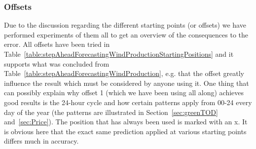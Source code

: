 \subsubsection{Offsets}
Due to the discussion regarding the different starting points (or offsets) we have performed experiments of them all to get an overview of the consequences to the error. All offsets have been tried in Table~\ref{table:stepAheadForecastingWindProductionStartingPositions} and it supports what was concluded from Table~\ref{table:stepAheadForecastingWindProduction}, e.g. that the offset greatly influence the result which must be considered by anyone using it. One thing that can possibly explain why offset 1 (which we have been using all along) achieves good results is the 24-hour cycle and how certain patterns apply from 00-24 every day of the year (the patterns are illustrated in Section~\ref{sec:greenTOD} and~\ref{sec:Price}). The position that has always been used is marked with an x. It is obvious here that the exact same prediction applied at various starting points differs much in accuracy. 

